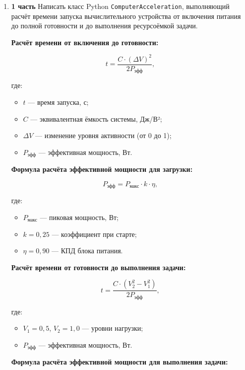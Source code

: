 \begin{enumerate}
\item[20] \textbf{1 часть}  
Написать класс Python \texttt{ComputerAcceleration}, выполняющий расчёт времени запуска вычислительного устройства от включения питания до полной готовности и до выполнения ресурсоёмкой задачи.

\textbf{Расчёт времени от включения до готовности:}

\begin{equation}
t = \frac{C \cdot (\Delta V)^2}{2P_{\text{эфф}}},
\end{equation}

где:  
\begin{itemize}
    \item $t$ — время запуска, с;  
    \item $C$ — эквивалентная ёмкость системы, Дж/В²;  
    \item $\Delta V$ — изменение уровня активности (от 0 до 1);  
    \item $P_{\text{эфф}}$ — эффективная мощность, Вт.  
\end{itemize}

\textbf{Формула расчёта эффективной мощности для загрузки:}

\begin{equation}
P_{\text{эфф}} = P_{\text{макс}} \cdot k \cdot \eta,
\end{equation}

где:  
\begin{itemize}
    \item $P_{\text{макс}}$ — пиковая мощность, Вт;  
    \item $k = 0{,}25$ — коэффициент при старте;  
    \item $\eta = 0{,}90$ — КПД блока питания.  
\end{itemize}

\textbf{Расчёт времени от готовности до выполнения задачи:}

\begin{equation}
t = \frac{C \cdot (V_2^2 - V_1^2)}{2P_{\text{эфф}}},
\end{equation}

где:  
\begin{itemize}
    \item $V_1 = 0{,}5$, $V_2 = 1{,}0$ — уровни нагрузки;  
    \item $P_{\text{эфф}}$ — эффективная мощность, Вт.  
\end{itemize}

\textbf{Формула расчёта эффективной мощности для выполнения задачи:}


\end{enumerate}
